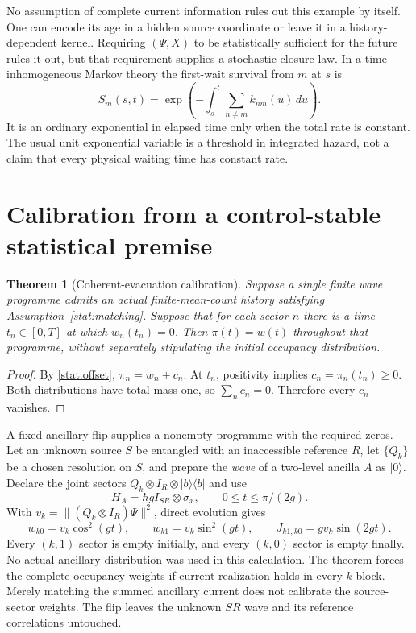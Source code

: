\documentclass[11pt,oneside,openany]{book}
\newtheorem{theorem}{Theorem}[chapter]
\theoremstyle{definition}
\theoremstyle{remark}\newtheorem{remark}[theorem]{Remark}
\begin{document}
No assumption of complete current information rules out this example by
itself. One can encode its age in a hidden source coordinate or leave it in a
history-dependent kernel. Requiring $(\Psi,X)$ to be statistically sufficient
for the future rules it out, but that requirement supplies a stochastic
closure law. In a time-inhomogeneous Markov theory the first-wait survival
from $m$ at $s$ is
\begin{equation}\label{stat:survival}
 S_m(s,t)=\exp\left(-\int_s^t\sum_{n\ne m} k_{nm}(u)\,du\right).
\end{equation}
It is an ordinary exponential in elapsed time only when the total rate is
constant. The usual unit exponential variable is a threshold in integrated
hazard, not a claim that every physical waiting time has constant rate.

\section{Calibration from a control-stable statistical premise}

\begin{theorem}[Coherent-evacuation calibration]\label{stat:calibration}
Suppose a single finite wave programme admits an actual finite-mean-count
history satisfying Assumption~\ref{stat:matching}. Suppose that for each
sector $n$ there is a time $t_n\in[0,T]$ at which $w_n(t_n)=0$. Then
$\pi(t)=w(t)$ throughout that programme, without separately stipulating the
initial occupancy distribution.
\end{theorem}
\begin{proof}
By \eqref{stat:offset}, $\pi_n=w_n+c_n$. At $t_n$, positivity implies
$c_n=\pi_n(t_n)\geq0$. Both distributions have total mass one, so
$\sum_n c_n=0$. Therefore every $c_n$ vanishes.
\end{proof}

A fixed ancillary flip supplies a nonempty programme with the required
zeros. Let an unknown source $S$ be entangled with an inaccessible reference
$R$, let $\{Q_k\}$ be a chosen resolution on $S$, and prepare the \emph{wave}
of a two-level ancilla $A$ as $|0\rangle$. Declare the joint sectors
$Q_k\otimes I_R\otimes|b\rangle\langle b|$ and use
\begin{equation}\label{stat:ancilla-flip}
 H_A=\hbar g I_{SR}\otimes\sigma_x,\qquad
 0\leq t\leq\pi/(2g).
\end{equation}
With $v_k=\|(Q_k\otimes I_R)\Psi\|^2$, direct evolution gives
\begin{equation}\label{stat:flip-current}
 w_{k0}=v_k\cos^2(gt),\qquad w_{k1}=v_k\sin^2(gt),
 \qquad J_{k1,k0}=gv_k\sin(2gt).
\end{equation}
Every $(k,1)$ sector is empty initially, and every $(k,0)$ sector is empty
finally. No actual ancillary distribution was used in this calculation.
The theorem forces the complete occupancy weights if current realization
holds in every $k$ block. Merely matching the summed ancillary current does
not calibrate the source-sector weights. The flip leaves the unknown
$SR$ wave and its reference correlations untouched.
\end{document}
